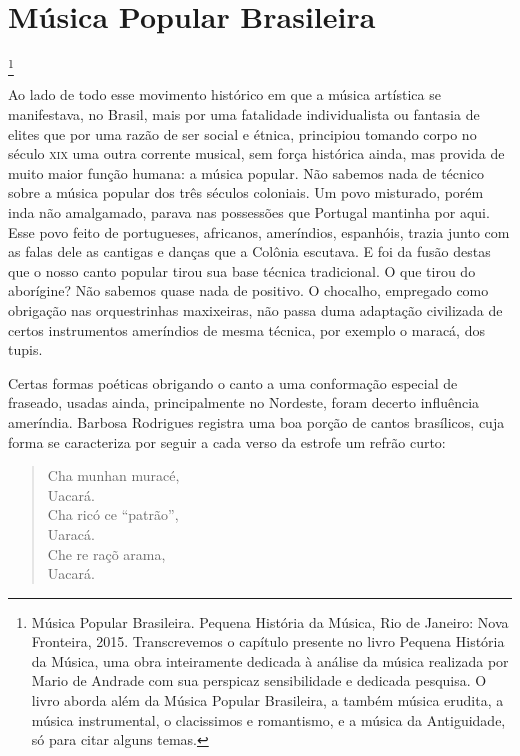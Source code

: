 \chapter{Música Popular Brasileira}\footnote{Música Popular Brasileira. Pequena História da Música, Rio de Janeiro: Nova Fronteira, 2015. Transcrevemos o capítulo presente no livro Pequena História da Música, uma obra inteiramente dedicada à análise da música realizada por Mario de Andrade com sua perspicaz sensibilidade e dedicada pesquisa. O livro aborda além da Música Popular Brasileira, a também música erudita, a música instrumental, o clacissimos e romantismo, e a música da Antiguidade, só para citar alguns temas.}


Ao lado de todo esse movimento histórico em que a música artística se
manifestava, no Brasil, mais por uma fatalidade individualista ou
fantasia de elites que por uma razão de ser social e étnica, principiou
tomando corpo no século \textsc{xix} uma outra corrente musical, sem força
histórica ainda, mas provida de muito maior função humana: a música
popular. Não sabemos nada de técnico sobre a música popular dos três
séculos coloniais. Um povo misturado, porém inda não amalgamado, parava
nas possessões que Portugal mantinha por aqui. Esse povo feito de
portugueses, africanos, ameríndios, espanhóis, trazia junto com as falas
dele as cantigas e danças que a Colônia escutava. E foi da fusão destas
que o nosso canto popular tirou sua base técnica tradicional. O que
tirou do aborígine? Não sabemos quase nada de positivo. O chocalho,
empregado como obrigação nas orquestrinhas maxixeiras, não passa duma
adaptação civilizada de certos instrumentos ameríndios de mesma técnica,
por exemplo o maracá, dos tupis.

Certas formas poéticas obrigando o canto a uma conformação especial de
fraseado, usadas ainda, principalmente no Nordeste, foram decerto
influência ameríndia. Barbosa Rodrigues registra uma boa porção de
cantos brasílicos, cuja forma se caracteriza por seguir a cada verso da
estrofe um refrão curto:

\begin{verse}
Cha munhan muracé,\\
Uacará.\\
Cha ricó ce ``patrão'',\\
Uaracá.\\
Che re raçõ arama,\\
Uacará.
\end{verse}

